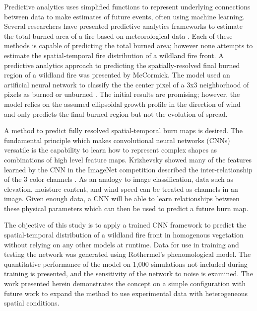 \documentclass[smallcondensed]{svjour3}     %
\begin{document}
Predictive analytics uses simplified functions to represent underlying connections
between data to make estimates of future events, often using machine learning.
Several researchers have presented predictive analytics frameworks to estimate the
total burned area of a fire based on meteorological data 
\cite{safi2013prediction,castelli2015predicting,storer2016pso,naganathan2016wildfire,cao2017wildfire}.
Each of these methods is capable of predicting the total burned area; however none
attempts to estimate the spatial-temporal fire distribution of a wildland fire front.
A predictive analytics approach to predicting the spatially-resolved final burned
region of a wildland fire was presented by McCormick.
The model used an artificial neural network to classify
the the center pixel of a 3x3 neighborhood of pixels as burned or unburned
\cite{mccormick2001toward,mccormick2002developing}.
The initial results are promising; however, the model relies on the assumed
ellipsoidal growth profile in the direction of wind
\cite{finney1999mechanistic} and only predicts the final burned region but 
not the evolution of spread.

A method to predict fully resolved spatial-temporal burn maps is desired.
The fundamental principle which makes convolutional neural networks (CNNs)
versatile is the capability to learn how to represent complex
shapes as combinations of high level feature maps. Krizhevsky showed
many of the features learned by the CNN in the ImageNet competition
described the inter-relationship of the 3 color channels \cite{krizhevsky2012imagenet}.
As an analogy to image classification, data such as elevation, moisture content, and 
wind speed can be treated as channels in an image. Given enough data, a CNN will be
able to learn relationships between these physical parameters which can then be used
to predict a future burn map. 

The objective of this study is to apply a trained CNN framework to predict the
spatial-temporal distribution of a wildland fire front in homogenous vegetation
without relying on any other models at runtime. Data for use in
training and testing the network was generated using Rothermel's phenomological
model. The quantitative performance of the model on 1,000 simulations not included
during training is presented, and
the sensitivity of the network to noise is examined.
The work presented herein demonstrates the concept
on a simple configuration with future work to expand the method to use
experimental data with heterogeneous spatial conditions.
\end{document}
